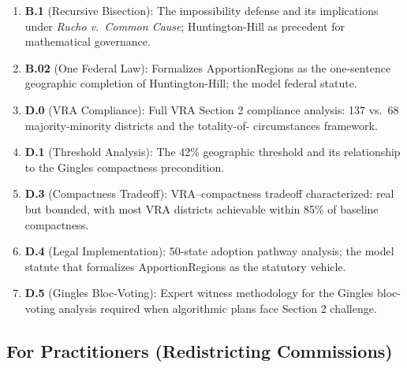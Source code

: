 \documentclass[12pt]{article}
\begin{document}
\begin{enumerate}[leftmargin=*,noitemsep,topsep=2pt]
    \item \textbf{B.1} (Recursive Bisection): The impossibility defense and
        its implications under \emph{Rucho v.\ Common Cause}; Huntington-Hill
        as precedent for mathematical governance.

    \item \textbf{B.02} (One Federal Law): Formalizes ApportionRegions as the
        one-sentence geographic completion of Huntington-Hill; the model
        federal statute.

    \item \textbf{D.0} (VRA Compliance): Full VRA Section 2 compliance
        analysis: 137 vs.\ 68 majority-minority districts and the totality-of-
        circumstances framework.

    \item \textbf{D.1} (Threshold Analysis): The 42\% geographic threshold
        and its relationship to the Gingles compactness precondition.

    \item \textbf{D.3} (Compactness Tradeoff): VRA--compactness tradeoff
        characterized: real but bounded, with most VRA districts achievable
        within 85\% of baseline compactness.

    \item \textbf{D.4} (Legal Implementation): 50-state adoption pathway
        analysis; the model statute that formalizes ApportionRegions as the
        statutory vehicle.

    \item \textbf{D.5} (Gingles Bloc-Voting): Expert witness methodology for
        the Gingles bloc-voting analysis required when algorithmic plans face
        Section 2 challenge.
\end{enumerate}

\subsection{For Practitioners (Redistricting Commissions)}
\end{document}
